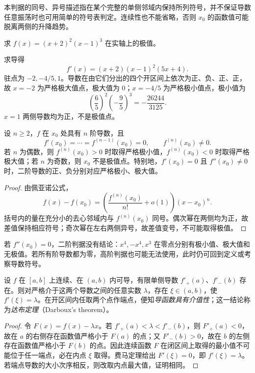 本判据的同号、异号描述指在某个完整的单侧邻域内保持所列符号，并不保证导数任意振荡时也可用简单的符号表判定。连续性也不能省略，否则 $x_0$ 的函数值可能脱离两侧的升降趋势。

\begin{example}
\label{ex:polynomial-stationary-point-classification}
求 $f(x)=(x+2)^2(x-1)^3$ 在实轴上的极值。
\end{example}

\begin{solve}
求导得
\[
    f'(x)=(x+2)(x-1)^2(5x+4).
\]
驻点为 $-2,-4/5,1$。导数在由它们分出的四个开区间上依次为正、负、正、正，故 $x=-2$ 为严格极大值点，极大值为 $0$；$x=-4/5$ 为严格极小值点，极小值为
\[
    \left(\frac65\right)^2\left(-\frac95\right)^3
    =-\frac{26244}{3125}.
\]
$x=1$ 两侧导数均为正，不是极值点。
\end{solve}

\begin{theorem}[极值的高阶导数判别]
\label{thm:higher-derivative-extremum-test}
设 $n\geq2$，$f$ 在 $x_0$ 处具有 $n$ 阶导数，且
\[
    f'(x_0)=\cdots=f^{(n-1)}(x_0)=0,
    \qquad f^{(n)}(x_0)\neq0.
\]
若 $n$ 为偶数，则 $f^{(n)}(x_0)>0$ 时取得严格极小值，$f^{(n)}(x_0)<0$ 时取得严格极大值；若 $n$ 为奇数，则 $x_0$ 不是极值点。特别地，$f'(x_0)=0$ 且 $f''(x_0)\neq0$ 时，二阶导数的正、负分别对应严格极小、极大值。
\end{theorem}

\begin{proof}
由佩亚诺公式，
\[
    f(x)-f(x_0)
    =\left(\frac{f^{(n)}(x_0)}{n!}+o(1)\right)(x-x_0)^n.
\]
括号内的量在充分小的去心邻域内与 $f^{(n)}(x_0)$ 同号。偶次幂在两侧均为正，故差值保持相应符号；奇次幂在左右两侧异号，故差值变号，不可能取得极值。
\end{proof}

若 $f''(x_0)=0$，二阶判据没有结论：$x^4,-x^4,x^3$ 在零点分别有极小值、极大值和无极值。若所有阶导数都为零，高阶判据也可能无法使用，此时仍可回到定义或考察导数符号。

\begin{theorem}[达布定理]
\label{thm:darboux-derivative-intermediate-value}
设 $f$ 在 $[a,b]$ 上连续、在 $(a,b)$ 内可导，有限单侧导数 $f'_+(a)$、$f'_-(b)$ 存在。则对严格介于这两个导数之间的任意实数 $\lambda$，存在 $\xi\in(a,b)$，使 $f'(\xi)=\lambda$。在开区间内任取两个点作端点，便知\emph{导函数具有介值性}；这一结论称为\emph{达布定理}（Darboux's theorem）。
\end{theorem}

\begin{proof}
令 $F(x)=f(x)-\lambda x$。若 $f'_+(a)<\lambda<f'_-(b)$，则 $F'_+(a)<0$，故在 $a$ 的右侧存在函数值严格小于 $F(a)$ 的点；又 $F'_-(b)>0$，故在 $b$ 的左侧存在函数值严格小于 $F(b)$ 的点。因此连续函数 $F$ 在闭区间上取得的最小值不可能位于任一端点，必在内点 $\xi$ 取得。费马定理给出 $F'(\xi)=0$，即 $f'(\xi)=\lambda$。若端点导数的大小次序相反，则改取内点最大值，证明相同。
\end{proof}

